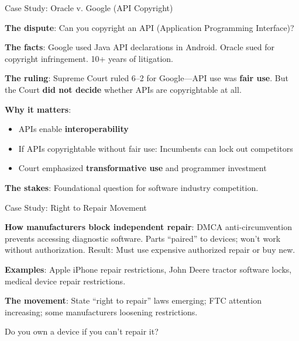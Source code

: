 ﻿\documentclass[aspectratio=169,11pt]{beamer}
\begin{document}
\begin{frame}{Case Study: Oracle v. Google (API Copyright)}
\begin{casestudybox}
\textbf{The dispute}: Can you copyright an API (Application Programming Interface)?

\textbf{The facts}: Google used Java API declarations in Android. Oracle sued for copyright infringement. 10+ years of litigation.

\textbf{The ruling}: Supreme Court ruled 6--2 for Google---API use was \textbf{fair use}. But the Court \textbf{did not decide} whether APIs are copyrightable at all.
\end{casestudybox}

\vspace{0.2cm}
\textbf{Why it matters}:
\begin{itemize}
    \item APIs enable \textbf{interoperability}
    \item If APIs copyrightable without fair use: Incumbents can lock out competitors
    \item Court emphasized \textbf{transformative use} and programmer investment
\end{itemize}

\textbf{The stakes}: Foundational question for software industry competition.
\end{frame}

\begin{frame}{Case Study: Right to Repair Movement}
\begin{casestudybox}
\textbf{How manufacturers block independent repair}: DMCA anti-circumvention prevents accessing diagnostic software. Parts ``paired'' to devices; won't work without authorization. Result: Must use expensive authorized repair or buy new.
\end{casestudybox}

\vspace{0.2cm}
\textbf{Examples}: Apple iPhone repair restrictions, John Deere tractor software locks, medical device repair restrictions.

\vspace{0.2cm}
\textbf{The movement}: State ``right to repair'' laws emerging; FTC attention increasing; some manufacturers loosening restrictions.

\begin{discussionbox}[Discussion]
Do you own a device if you can't repair it?
\end{discussionbox}
\end{frame}
\end{document}
